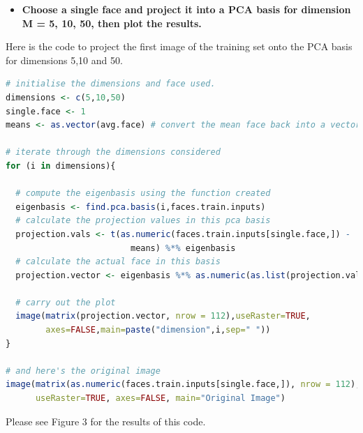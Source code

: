 \documentclass[11pt]{article}
\begin{document}
\begin{itemize}
\item \textbf{Choose a single face and project it into a PCA basis for dimension M = 5, 10, 50, then plot the results.}
\end{itemize}

Here is the code to project the first image of the training set onto the PCA basis for dimensions 5,10 and 50.
\begin{lstlisting}[linewidth=18.4cm,language=R]
# initialise the dimensions and face used.
dimensions <- c(5,10,50)
single.face <- 1
means <- as.vector(avg.face) # convert the mean face back into a vector

# iterate through the dimensions considered
for (i in dimensions){
  
  # compute the eigenbasis using the function created
  eigenbasis <- find.pca.basis(i,faces.train.inputs)
  # calculate the projection values in this pca basis
  projection.vals <- t(as.numeric(faces.train.inputs[single.face,]) - 
                         means) %*% eigenbasis
  # calculate the actual face in this basis
  projection.vector <- eigenbasis %*% as.numeric(as.list(projection.vals))
  
  # carry out the plot
  image(matrix(projection.vector, nrow = 112),useRaster=TRUE, 
        axes=FALSE,main=paste("dimension",i,sep=" "))
}

# and here's the original image
image(matrix(as.numeric(faces.train.inputs[single.face,]), nrow = 112), 
      useRaster=TRUE, axes=FALSE, main="Original Image")
\end{lstlisting}
Please see Figure 3 for the results of this code.
\end{document}
